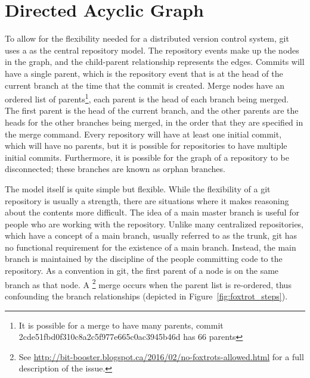 \section{Directed Acyclic Graph}
\label{sec:directed_acyclic_graph}

To allow for the flexibility needed for a distributed version control
system, git uses a  as the central
repository model.
The repository events make up the nodes in the graph, and the
child-parent relationship represents the edges.
Commits will have a single parent, which is the repository event that
is at the head of the current branch at the time that the commit
is created.
Merge nodes have an ordered list of
parents\footnote{It is possible for a merge to have many parents, commit
  2cde51fbd0f310c8a2c5f977e665c0ac3945b46d has 66 parents},
each parent is the head of each branch being merged.
The first parent is the head of the current branch, and the other
parents are the heads for the other branches being merged, in the order
that they are specified in the merge command.
Every repository will have at least one initial commit, which
will have no parents, but it is possible for repositories to have
multiple initial commits.
Furthermore, it is possible for the graph of a repository to be
disconnected; these branches are known as orphan branches.

The model itself is quite simple but flexible. While the flexibility of
a git repository is usually a strength, there are situations where it
makes reasoning about the contents more difficult. The idea of a main
master branch is useful for people who are working with the repository.
Unlike many centralized repositories, which have a concept of a main
branch, usually referred to as the trunk, git has no functional
requirement for the existence of a main branch. Instead, the main branch
is maintained by the discipline of the people committing code to the
repository. As a convention in git, the first parent of a node is on the
same branch as that node. A \foxtrot\footnote{See
  \url{http://bit-booster.blogspot.ca/2016/02/no-foxtrots-allowed.html}
  for a full description of the issue.} merge occurs when the parent
list is re-ordered, thus confounding the branch relationships
(depicted in Figure~\ref{fig:foxtrot_steps}).

